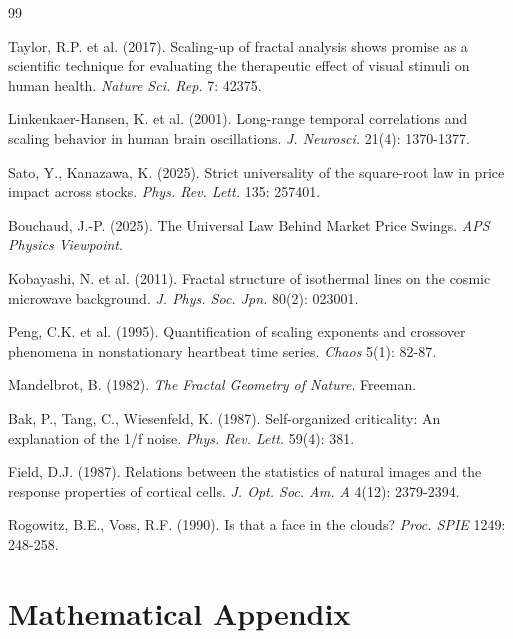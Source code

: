 \documentclass[11pt,a4paper]{article}
\begin{document}

\begin{thebibliography}{99}

Taylor, R.P. et al. (2017). Scaling-up of fractal analysis shows promise as a scientific technique for evaluating the therapeutic effect of visual stimuli on human health. \textit{Nature Sci. Rep.} 7: 42375.

Linkenkaer-Hansen, K. et al. (2001). Long-range temporal correlations and scaling behavior in human brain oscillations. \textit{J. Neurosci.} 21(4): 1370-1377.

Sato, Y., Kanazawa, K. (2025). Strict universality of the square-root law in price impact across stocks. \textit{Phys. Rev. Lett.} 135: 257401.

Bouchaud, J.-P. (2025). The Universal Law Behind Market Price Swings. \textit{APS Physics Viewpoint}.

Kobayashi, N. et al. (2011). Fractal structure of isothermal lines on the cosmic microwave background. \textit{J. Phys. Soc. Jpn.} 80(2): 023001.

Peng, C.K. et al. (1995). Quantification of scaling exponents and crossover phenomena in nonstationary heartbeat time series. \textit{Chaos} 5(1): 82-87.

Mandelbrot, B. (1982). \textit{The Fractal Geometry of Nature}. Freeman.

Bak, P., Tang, C., Wiesenfeld, K. (1987). Self-organized criticality: An explanation of the 1/f noise. \textit{Phys. Rev. Lett.} 59(4): 381.

Field, D.J. (1987). Relations between the statistics of natural images and the response properties of cortical cells. \textit{J. Opt. Soc. Am. A} 4(12): 2379-2394.

Rogowitz, B.E., Voss, R.F. (1990). Is that a face in the clouds? \textit{Proc. SPIE} 1249: 248-258.

\end{thebibliography}

\appendix
\section{Mathematical Appendix}
\end{document}
